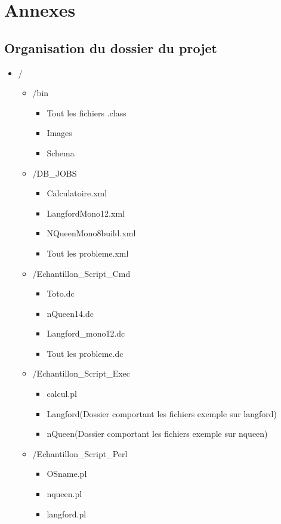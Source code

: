 \documentclass[11pt]{article}
\begin{document}
\newpage

\section{Annexes}
\subsection{Organisation du dossier du projet}
\begin{itemize}
\item / \begin{itemize}
		\item /bin  \begin{itemize} \item Tout les fichiers .class \item Images \item Schema    \end{itemize}
		\item /DB\_JOBS \begin{itemize} \item Calculatoire.xml \item LangfordMono12.xml \item NQueenMono8build.xml \ \item Tout les probleme.xml \end{itemize}
		\item /Echantillon\_Script\_Cmd \begin{itemize} \item Toto.dc \item nQueen14.dc \item Langford\_mono12.dc\item Tout les probleme.dc\end{itemize}
		\item /Echantillon\_Script\_Exec \begin{itemize}\item calcul.pl \item Langford(Dossier comportant les fichiers exemple sur langford) \item nQueen(Dossier comportant les fichiers exemple sur nqueen)  \end{itemize}
		\item /Echantillon\_Script\_Perl \begin{itemize}\item  OSname.pl \item nqueen.pl \item langford.pl\end{itemize}

\end{itemize}
\end{itemize}
\end{document}
